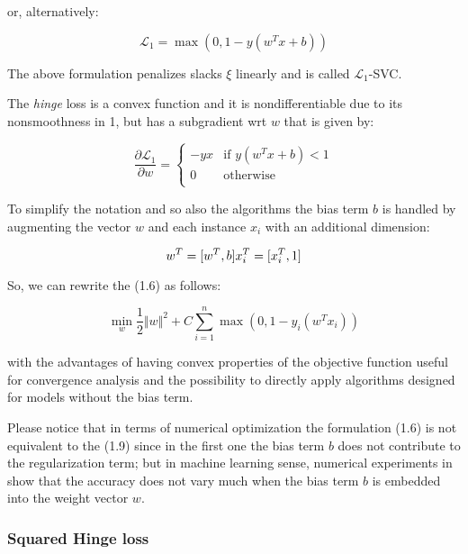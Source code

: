 or, alternatively:

\begin{equation}
	\mathcal{L}_1 = \max(0, 1 - y (w^T x + b)) \tag{1.7b}
\end{equation}

The above formulation penalizes slacks $\xi$ linearly and is called $\mathcal{L}_1$-SVC.

The \emph{hinge} loss is a convex function and it is nondifferentiable due to its nonsmoothness in 1, but has a subgradient wrt $w$ that is given by:

\begin{equation}
    \frac{\partial \mathcal{L}_1}{\partial w}=
        \begin{cases}
            -y x & \text{if } y (w^T x + b) < 1 \\
            0 & \text{otherwise} \\ 
        \end{cases} \tag{1.8}
\end{equation}

To simplify the notation and so also the algorithms the bias term $b$ is handled by augmenting the vector $w$ and each instance $x_i$ with an additional dimension:

$$
w^T = [w^T, b] \\
x_i^T = [x_i^T, 1]
$$

So, we can rewrite the (1.6) as follows:

\begin{equation}
    \min_{w} \frac{1}{2} \Vert w \Vert^2 + C \sum_{i=1}^n \max(0, 1 - y_i (w^T x_i)) \tag{1.9}
\end{equation}

with the advantages of having convex properties of the objective function useful for convergence analysis and the possibility to directly apply algorithms designed for models without the bias term.

Please notice that in terms of numerical optimization the formulation (1.6) is not equivalent to the (1.9) since in the first one the bias term $b$ does not contribute to the regularization term; but in machine learning sense, numerical experiments in \cite{hsu2002simple} show that the accuracy does not vary much when the bias term $b$ is embedded into the weight vector $w$.

\subsubsection{Squared Hinge loss}

